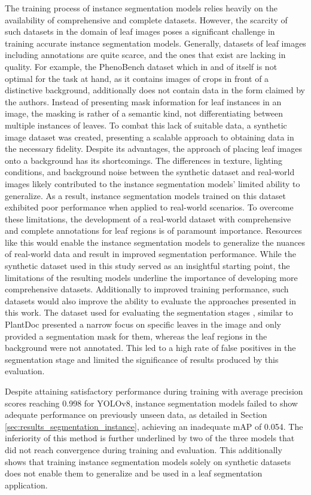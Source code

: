 \documentclass[draft,final]{vutinfth} %
\begin{document}
The training process of instance segmentation models relies heavily on the availability of comprehensive and complete datasets. However, the scarcity of such datasets in the domain of leaf images poses a significant challenge in training accurate instance segmentation models. Generally, datasets of leaf images including annotations are quite scarce, and the ones that exist are lacking in quality. For example, the PhenoBench dataset \cite{weyler_phenobench_2023} which in and of itself is not optimal for the task at hand, as it contains images of crops in front of a distinctive background, additionally does not contain data in the form claimed by the authors. Instead of presenting mask information for leaf instances in an image, the masking is rather of a semantic kind, not differentiating between multiple instances of leaves. To combat this lack of suitable data, a synthetic image dataset was created, presenting a scalable approach to obtaining data in the necessary fidelity. 
Despite its advantages, the approach of placing leaf images onto a background has its shortcomings. The differences in texture, lighting conditions, and background noise between the synthetic dataset and real-world images likely contributed to the instance segmentation models' limited ability to generalize. As a result, instance segmentation models trained on this dataset exhibited poor performance when applied to real-world scenarios.
To overcome these limitations, the development of a real-world dataset with comprehensive and complete annotations for leaf regions is of paramount importance. Resources like this would enable the instance segmentation models to generalize the nuances of real-world data and result in improved segmentation performance. While the synthetic dataset used in this study served as an insightful starting point, the limitations of the resulting models underline the importance of developing more comprehensive datasets.
Additionally to improved training performance, such datasets would also improve the ability to evaluate the approaches presented in this work. The dataset used for evaluating the segmentation stages \cite{giovi_leaf_2024}, similar to PlantDoc \cite{singh_plantdoc_2020} presented a narrow focus on specific leaves in the image and only provided a segmentation mask for them, whereas the leaf regions in the background were not annotated. This led to a high rate of false positives in the segmentation stage and limited the significance of results produced by this evaluation. 

Despite attaining satisfactory performance during training with average precision scores reaching 0.998 for YOLOv8, instance segmentation models failed to show adequate performance on previously unseen data, as detailed in Section \ref{sec:results_segmentation_instance}, achieving an inadequate mAP of 0.054. 
The inferiority of this method is further underlined by two of the three models that did not reach convergence during training and evaluation. This additionally shows that training instance segmentation models solely on synthetic datasets does not enable them to generalize and be used in a leaf segmentation application.
\end{document}
